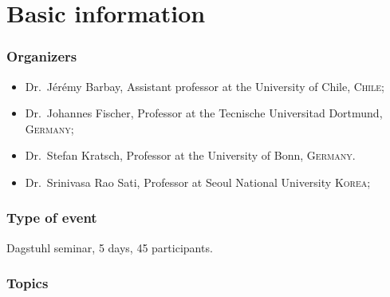 \documentclass[a4paper,10pt]{article}
\begin{document}


\section{Basic information}

\subsubsection*{ Organizers} 
\begin{itemize}
\item Dr.\ J\'er\'emy Barbay, Assistant professor at the University of Chile, \textsc{Chile};
\item Dr.\ Johannes Fischer, Professor at the Tecnische Universitad Dortmund, \textsc{Germany};
\item Dr.\ Stefan Kratsch,  Professor at the University of Bonn, \textsc{Germany}.
\item Dr.\ Srinivasa Rao Sati, Professor at Seoul National  University  \textsc{Korea};
\end{itemize}

\subsubsection*{Type of event}
Dagstuhl seminar, 5 days, 45 participants. 


\subsubsection*{Topics}

\end{document}
